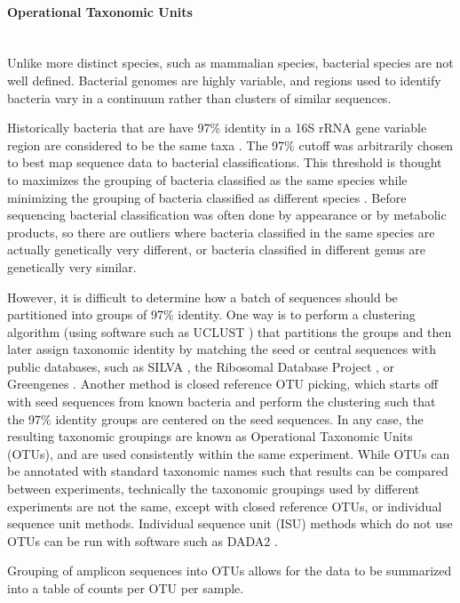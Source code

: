 \documentclass[10pt,letterpaper]{article}
\begin{document}
\paragraph{Operational Taxonomic Units}\mbox{}\\
Unlike more distinct species, such as mammalian species, bacterial species are not well defined. Bacterial genomes are highly variable, and regions used to identify bacteria vary in a continuum rather than clusters of similar sequences.

Historically bacteria that are have 97\% identity in a 16S rRNA gene variable region are considered to be the same taxa \cite{ciccarelli2006toward}. The 97\% cutoff was arbitrarily chosen to best map sequence data to bacterial classifications. This threshold is thought to maximizes the grouping of bacteria classified as the same species while minimizing the grouping of bacteria classified as different species \cite{caporaso2011global}. Before sequencing bacterial classification was often done by appearance or by metabolic products, so there are outliers where bacteria classified in the same species are actually genetically very different, or bacteria classified in different genus are genetically very similar.

However, it is difficult to determine how a batch of sequences should be partitioned into groups of 97\% identity. One way is to perform a clustering algorithm (using software such as UCLUST \cite{edgar2010search}) that partitions the groups and then later assign taxonomic identity by matching the seed or central sequences with public databases, such as SILVA \cite{quast2013silva}, the Ribosomal Database Project \cite{cole2009ribosomal}, or Greengenes \cite{desantis2006greengenes}. Another method is closed reference OTU picking, which starts off with seed sequences from known bacteria and perform the clustering such that the 97\% identity groups are centered on the seed sequences. In any case, the resulting taxonomic groupings are known as Operational Taxonomic Units (OTUs), and are used consistently within the same experiment. While OTUs can be annotated with standard taxonomic names such that results can be compared between experiments, technically the taxonomic groupings used by different experiments are not the same, except with closed reference OTUs, or individual sequence unit methods. Individual sequence unit (ISU) methods which do not use OTUs can be run with software such as DADA2 \cite{callahan2015dada2}.

Grouping of amplicon sequences into OTUs allows for the data to be summarized into a table of counts per OTU per sample.
\end{document}
